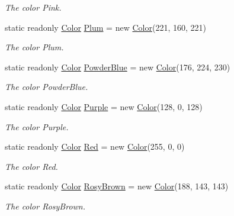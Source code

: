 \begin{DoxyCompactItemize}
\begin{DoxyCompactList}\small\item\em The color Pink. \end{DoxyCompactList}\item 
static readonly \hyperlink{struct_tri_devs_1_1_tri_engine_1_1_color}{Color} \hyperlink{struct_tri_devs_1_1_tri_engine_1_1_color_a9f0160e1a05f76c164f5243183f3bc4b}{Plum} = new \hyperlink{struct_tri_devs_1_1_tri_engine_1_1_color}{Color}(221, 160, 221)
\begin{DoxyCompactList}\small\item\em The color Plum. \end{DoxyCompactList}\item 
static readonly \hyperlink{struct_tri_devs_1_1_tri_engine_1_1_color}{Color} \hyperlink{struct_tri_devs_1_1_tri_engine_1_1_color_a21cd284bab7cefcbca51a5b8a9fb0439}{Powder\-Blue} = new \hyperlink{struct_tri_devs_1_1_tri_engine_1_1_color}{Color}(176, 224, 230)
\begin{DoxyCompactList}\small\item\em The color Powder\-Blue. \end{DoxyCompactList}\item 
static readonly \hyperlink{struct_tri_devs_1_1_tri_engine_1_1_color}{Color} \hyperlink{struct_tri_devs_1_1_tri_engine_1_1_color_afe252b898f58ae1b5b9623b202769025}{Purple} = new \hyperlink{struct_tri_devs_1_1_tri_engine_1_1_color}{Color}(128, 0, 128)
\begin{DoxyCompactList}\small\item\em The color Purple. \end{DoxyCompactList}\item 
static readonly \hyperlink{struct_tri_devs_1_1_tri_engine_1_1_color}{Color} \hyperlink{struct_tri_devs_1_1_tri_engine_1_1_color_a136ec790362a549d222325f44ea91942}{Red} = new \hyperlink{struct_tri_devs_1_1_tri_engine_1_1_color}{Color}(255, 0, 0)
\begin{DoxyCompactList}\small\item\em The color Red. \end{DoxyCompactList}\item 
static readonly \hyperlink{struct_tri_devs_1_1_tri_engine_1_1_color}{Color} \hyperlink{struct_tri_devs_1_1_tri_engine_1_1_color_a4bce585a1257a48390f509f60ffe067c}{Rosy\-Brown} = new \hyperlink{struct_tri_devs_1_1_tri_engine_1_1_color}{Color}(188, 143, 143)
\begin{DoxyCompactList}\small\item\em The color Rosy\-Brown. \end{DoxyCompactList}\item 

\end{DoxyCompactItemize}
